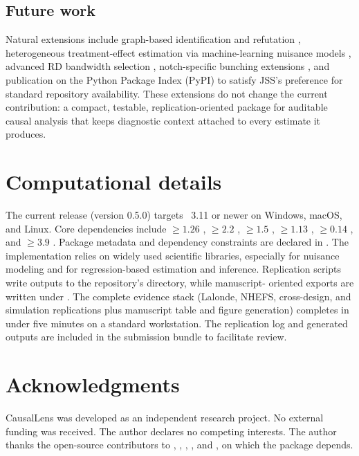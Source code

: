 \documentclass[article]{jss}
\begin{document}
\subsection{Future work}\label{sec:future}

Natural extensions include graph-based identification and refutation
\citep{Pearl2009,Imbens2020}, heterogeneous treatment-effect estimation
via machine-learning nuisance models
\citep{ChernozhukovEtAl2018,BattocchiEtAl2019}, advanced RD bandwidth
selection \citep{CalonicoCattaneoFarrell2020,ImbensKalyanaraman2012},
notch-specific bunching extensions \citep{Kleven2016}, and publication on
the Python Package Index (PyPI) to satisfy JSS's preference for standard
repository availability. These extensions do not change the current
contribution: a compact, testable, replication-oriented 
package for auditable causal analysis that keeps diagnostic context attached
to every estimate it produces.



\section*{Computational details}

The current release (version 0.5.0) targets ~3.11 or newer
on Windows, macOS, and Linux. Core dependencies include
 $\geq 1.26$ \citep{NumPyEtAl2020},
 $\geq 2.2$ \citep{McKinney2010},
 $\geq 1.5$ \citep{PedregosaEtAl2011},
 $\geq 1.13$ \citep{VirtanenEtAl2020},
 $\geq 0.14$ \citep{SeaboldPerktold2010}, and
 $\geq 3.9$ \citep{Hunter2007}. Package metadata and dependency constraints are
declared in . The implementation relies on
widely used scientific  libraries, especially
 for nuisance modeling and  for
regression-based estimation and inference.
Replication scripts write outputs to
the repository's  directory, while manuscript-
oriented exports are written under .
The complete evidence stack (Lalonde, NHEFS, cross-design, and simulation
replications plus manuscript table and figure generation) completes in under
five minutes on a standard workstation. The replication log and generated
outputs are included in the submission bundle to facilitate review.


\section*{Acknowledgments}

CausalLens was developed as an independent research project. No external
funding was received. The author declares no competing interests. The author
thanks the open-source contributors to
, , , , and
, on which the package depends.



\end{document}
